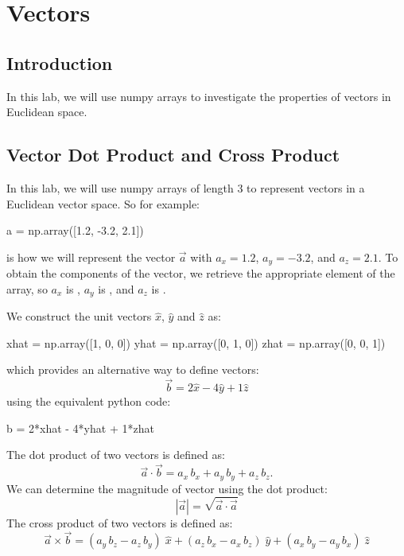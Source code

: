 \chapter{Vectors}

\section{Introduction}

In this lab, we will use numpy arrays to investigate the properties of
vectors in Euclidean space.

\section{Vector Dot Product and Cross Product }

In this lab, we will use numpy arrays of length 3 to represent vectors
in a Euclidean vector space.  So for example:
\begin{python}
  a = np.array([1.2, -3.2, 2.1])
\end{python}
is how we will represent the vector $\vec{a}$ with $a_x=1.2$,
$a_y=-3.2$, and $a_z=2.1$.  To obtain the components of the vector, we retrieve the appropriate element of the array, so $a_x$ is ,
$a_y$ is , and $a_z$ is .

We construct the unit vectors $\hat{x}$, $\hat{y}$ and $\hat{z}$ as:
\begin{python}
  xhat = np.array([1, 0, 0])
  yhat = np.array([0, 1, 0])
  zhat = np.array([0, 0, 1])
\end{python}
which provides an alternative way to define vectors:
\begin{displaymath}
\vec{b} = 2\hat{x} - 4\hat{y}+1\hat{z}
\end{displaymath}
using the equivalent python code:
\begin{python}
  b = 2*xhat - 4*yhat + 1*zhat
\end{python}

The dot product of two vectors is defined as:
\begin{displaymath}
\vec{a}\cdot\vec{b} = a_x \, b_x +  a_y \, b_y +  a_z \, b_z.
\end{displaymath}
We can determine the magnitude of vector using the dot product:
\begin{displaymath}
  |\vec{a}| = \sqrt{\vec{a}\cdot\vec{a}}
\end{displaymath}
The cross product of two vectors is defined as:
\begin{displaymath}
  \vec{a}\times\vec{b} =
  (a_y \, b_z -  a_z \, b_y) \; \hat{x}
  + (a_z \, b_x -  a_x \, b_z) \; \hat{y}
  + (a_x \, b_y -  a_y \, b_x) \; \hat{z}
\end{displaymath}

